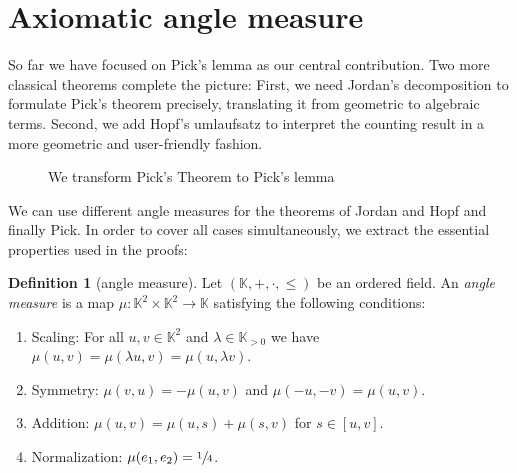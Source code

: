 \documentclass[a4paper]{amsart}
\numberwithin{equation}{section}
\theoremstyle{plain}
\theoremstyle{definition}
\newtheorem{definition}[theorem]{Definition}
\newcommand{\K}{\mathbb{K}}
\begin{document}
\setcounter{section}{0}
\section{Axiomatic angle measure}

So far we have focused on Pick's lemma as our central contribution.
Two more classical theorems complete the picture:
First, we need Jordan's decomposition to formulate Pick's theorem precisely, 
translating it from geometric to algebraic terms.
Second, we add Hopf's umlaufsatz to interpret the counting result 
in a more geometric and user-friendly fashion.

\begin{figure}[ht]
  \caption{We transform Pick's Theorem to Pick's lemma}
  \label{fig:PickTransform}
\end{figure}



We can use different angle measures for the theorems of
Jordan and Hopf and finally Pick.
In order to cover all cases simultaneously, 
we extract the essential properties used in the proofs:

\begin{definition}[angle measure\label{def:AngleMeasure}]
  Let $(\K,+,\cdot,\le)$ be an ordered field.
  An \emph{angle measure} is a map $\mu \colon \K^2 \times \K^2 \to \K$
  satisfying the following conditions:
  \begin{enumerate}
  \item
    Scaling: For all $u,v \in \K^2$ and $\lambda \in \K_{>0}$
    we have $\mu(u,v) = \mu(\lambda u, v) = \mu(u, \lambda v)$.
  \item
    Symmetry: $\mu(v,u) = -\mu(u,v)$ and $\mu(-u,-v) = \mu(u,v)$.
  \item
    Addition: $\mu(u,v) = \mu(u,s) + \mu(s,v)$ for $s \in [u,v]$.
  \item
    Normalization: $\mu(e_1,e_2) = \sfrac{1}{4}$.
  \end{enumerate}
\end{definition}
\end{document}
